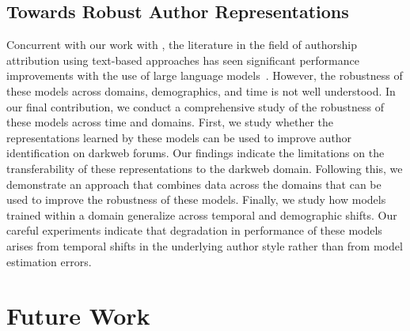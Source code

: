 \subsection{Towards Robust Author Representations}
Concurrent with our work with \SYSMLmethodname{}, the literature in the field of authorship attribution using text-based approaches has seen significant performance improvements with the use of large language models~\citep{khan2021deep,riverastao2021learning}.
However, the robustness of these models across domains, demographics, and time is not well understood.
In our final contribution, we conduct a comprehensive study of the robustness of these models across time and domains.
First, we study whether the representations learned by these models can be used to improve author identification on darkweb forums.
Our findings indicate the limitations on the transferability of these representations to the darkweb domain.
Following this, we demonstrate an approach that combines data across the domains that can be used to improve the robustness of these models.
Finally, we study how models trained within a domain generalize across temporal and demographic shifts.
Our careful experiments indicate that degradation in performance of these models arises from temporal shifts in the underlying author style rather than from model estimation errors.


\section{Future Work}

